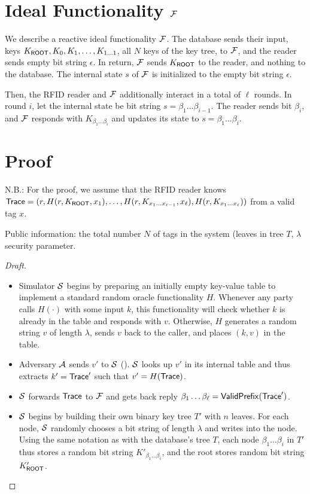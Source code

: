 \documentclass{article}
\begin{document}
\section{Ideal Functionality ${\mathcal{F}}$}
We describe a reactive ideal functionality ${\mathcal{F}}$.  The database sends
their input, keys $K_{\mathsf{ROOT}},K_0,K_1,\ldots,K_{1\ldots{}1}$, all $N$
keys of the key tree, to ${\mathcal{F}}$, and the reader sends empty bit string
$\epsilon$. In return, ${\mathcal{F}}$ sends $K_{\mathsf{ROOT}}$ to the reader, and
nothing to the database.  The internal state $s$ of ${\mathcal{F}}$ is
initialized to the empty bit string $\epsilon$.

Then, the RFID reader and ${\mathcal{F}}$ additionally interact in a total of
$\ell$ rounds. In round $i$, let the internal state be bit string
$s=\beta_1\ldots{}\beta_{i-1}$. The reader sends bit $\beta_i$, and
${\mathcal{F}}$ responds with $K_{\beta_1\ldots\beta_{i}}$ and updates its
state to $s=\beta_1\ldots\beta_{i}$.


\section{Proof}
N.B.: For the proof, we assume that the RFID reader knows
$\mathsf{Trace}=(r,H(r,
K_{\mathsf{ROOT}},x_1),\ldots,H(r,K_{x_1\ldots{}x_{\ell-1}},x_{\ell}),H(r,K_{x_1\ldots{}x_\ell}))$
from a valid tag $x$.

Public information: the total number $N$ of tags in the system (leaves
in tree $T$, $\lambda$ security parameter.

\begin{proof}[Draft]
  \begin{itemize}

  \item Simulator ${\mathcal{S}}$ begins by preparing an initially empty
    key-value table to implement a standard random oracle
    functionality $H$. Whenever any party calls $H(\cdot)$ with some
    input $k$, this functionality will check whether $k$ is already in
    the table and responds with $v$. Otherwise, $H$ generates a random
    string $v$ of length $\lambda$, sends $v$ back to the caller, and
    places $(k,v)$ in the table.

  \item Adversary ${\mathcal{A}}$ sends $v'$ to ${\mathcal{S}}$ (). ${\mathcal{S}}$ looks up $v'$ in its internal table and
    thus extracts $k'=\mathsf{Trace}'$ such that $v'=H(\mathsf{Trace})$.

  \item ${\mathcal{S}}$ forwards $\mathsf{Trace}$ to ${\mathcal{F}}$ and gets back reply
    $\beta_1\ldots\beta_\ell=\mathsf{ValidPrefix(\mathsf{Trace}')}$.
    
  \item  ${\mathcal{S}}$ begins by building their own binary key tree
    $T'$ with $n$ leaves.  For each node, ${\mathcal{S}}$ randomly chooses a
    bit string of length $\lambda$ and writes into the node.  Using
    the same notation as with the database's tree $T$, each node
    $\beta_1\ldots{}\beta_i$ in $T'$ thus stores a random bit string
    $K'_{\beta_1\ldots{}\beta_i}$, and the root stores random bit
    string $K'_{\mathsf{ROOT}}$.



    
    \end{itemize}
\end{proof}
\end{document}
